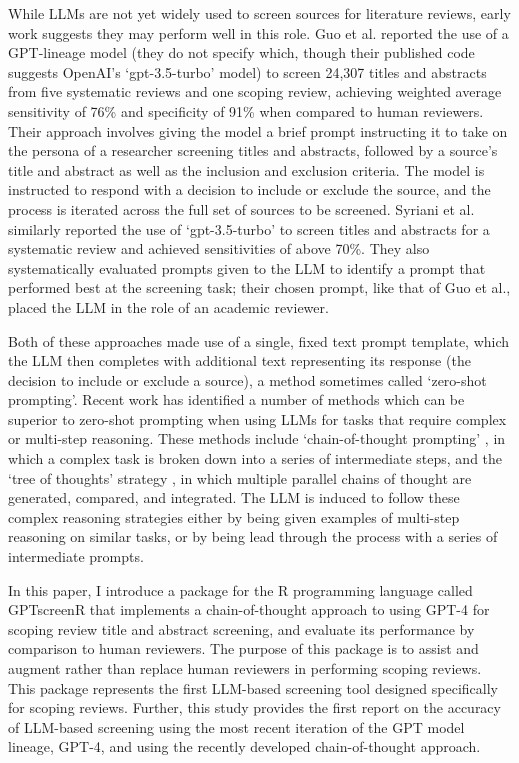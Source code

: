 \documentclass[10pt,a4paper,twocolumn]{article}
\begin{document}
While LLMs are not yet widely used to screen sources for literature reviews, early work suggests they may perform well in this role. Guo et al. \cite{Guo.2023} reported the use of a GPT-lineage model (they do not specify which, though their published code suggests OpenAI's `gpt-3.5-turbo' model) to screen 24,307 titles and abstracts from five systematic reviews and one scoping review, achieving weighted average sensitivity of 76\% and specificity of 91\% when compared to human reviewers. Their approach involves giving the model a brief prompt instructing it to take on the persona of a researcher screening titles and abstracts, followed by a source's title and abstract as well as the inclusion and exclusion criteria. The model is instructed to respond with a decision to include or exclude the source, and the process is iterated across the full set of sources to be screened. Syriani et al. \cite{Syriani.2023} similarly reported the use of `gpt-3.5-turbo' to screen titles and abstracts for a systematic review and achieved sensitivities of above 70\%. They also systematically evaluated prompts given to the LLM to identify a prompt that performed best at the screening task; their chosen prompt, like that of Guo et al., placed the LLM in the role of an academic reviewer.

Both of these approaches made use of a single, fixed text prompt template, which the LLM then completes with additional text representing its response (the decision to include or exclude a source), a method sometimes called `zero-shot prompting'. Recent work has identified a number of methods which can be superior to zero-shot prompting when using LLMs for tasks that require complex or multi-step reasoning. These methods include `chain-of-thought prompting' \cite{Wei.2022}, in which a complex task is broken down into a series of intermediate steps, and the `tree of thoughts' strategy \cite{Yao.2023}, in which multiple parallel chains of thought are generated, compared, and integrated. The LLM is induced to follow these complex reasoning strategies either by being given examples of multi-step reasoning on similar tasks, or by being lead through the process with a series of intermediate prompts.

In this paper, I introduce a package for the R programming language \cite{R.2023} called GPTscreenR that implements a chain-of-thought approach to using GPT-4 for scoping review title and abstract screening, and evaluate its performance by comparison to human reviewers. The purpose of this package is to assist and augment rather than replace human reviewers in performing scoping reviews. This package represents the first LLM-based screening tool designed specifically for scoping reviews. Further, this study provides the first report on the accuracy of LLM-based screening using the most recent iteration of the GPT model lineage, GPT-4, and using the recently developed chain-of-thought approach.
\end{document}
